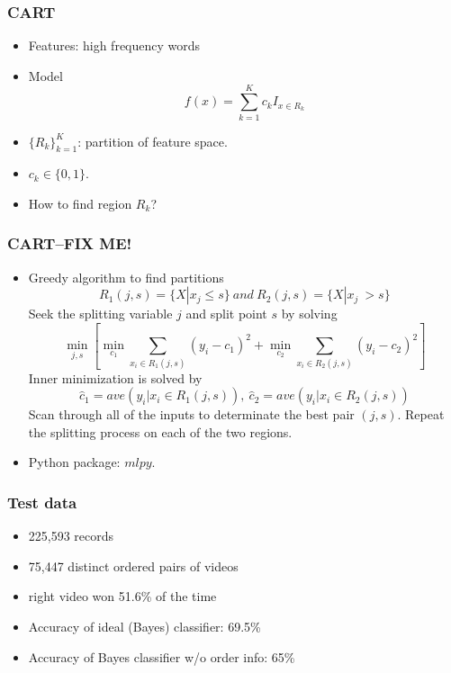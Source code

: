\documentclass[fleqn]{beamer}
\begin{document}
\begin{frame}
\frametitle{CART}
    \begin{itemize}
     \item Features: high frequency words
     \item Model
     $$f(x) = \sum_{k=1}^K c_k I_{x \in R_k}$$
     \item $\{R_k\}_{k=1}^K$: partition of feature space. 
     \item $c_k \in \{0, 1\}$.
     \item How to find region $R_k$?
    \end{itemize}
\end{frame}
\begin{frame}
\frametitle{CART--FIX ME!}
  \begin{itemize}
   \item Greedy algorithm to find partitions
   $$R_1(j, s) = \{X|x_j \leq s\}\ and\ R_2(j, s) = \{X|x_j \ > s\}$$
   Seek the splitting variable $j$ and split point $s$ by solving
   $$\min_{j,s} [\min_{c_1} \sum_{x_i \in R_1(j, s)} (y_i - c_1)^2 + \min_{c_2} 
   \sum_{x_i \in R_2(j, s)} (y_i - c_2)^2]$$
   Inner minimization is solved by
   $$\hat{c}_1 = ave(y_i| x_i \in R_1(j,s)),\ \hat{c}_2 = ave(y_i|x_i \in R_2(j,s))$$
   Scan through all of the inputs to determinate the best pair $(j, s)$. 
   Repeat the splitting process on each of the two regions.
  \item Python package: $mlpy$.
  \end{itemize}

\end{frame}

\begin{frame}
\frametitle{Test data}
    \begin{itemize}
        \item 225,593 records
        \item 75,447 distinct ordered pairs of videos
        \item right video won 51.6\% of the time
        \item Accuracy of ideal (Bayes) classifier: 69.5\% 
        \item Accuracy of Bayes classifier w/o order info: 65\%
    \end{itemize}

\end{frame}
\end{document}
